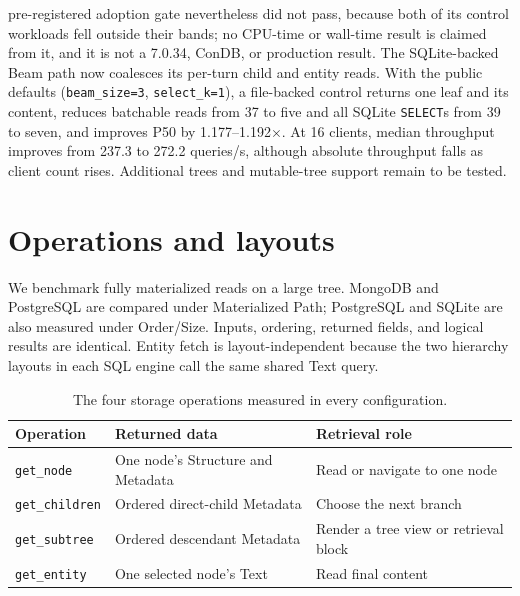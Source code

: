 \documentclass[10pt]{article}
\newcommand{\code}[1]{\texttt{#1}}
\newcommand{\hdr}{\rowcolor{hdrgray}}
\newenvironment{ctab}{\par\smallskip\centering\small
  \setlength{\tabcolsep}{5pt}\renewcommand{\arraystretch}{1.12}}{\par\smallskip}
\renewenvironment{abstract}{%
  \par\medskip\noindent{\bfseries\abstractname.}\enspace\ignorespaces
}{\par\medskip}
\begin{document}
\begin{abstract}
pre-registered adoption gate nevertheless did not pass, because both of its
control workloads fell outside their bands; no CPU-time or wall-time result is
claimed from it, and it is not a 7.0.34, ConDB, or production result. The SQLite-backed Beam path now
coalesces its per-turn child and
entity reads. With the public defaults (\code{beam\_size=3},
\code{select\_k=1}), a file-backed control returns one leaf and its content,
reduces batchable reads from 37 to five and all SQLite \code{SELECT}s from 39
to seven, and improves P50 by 1.177--1.192$\times$. At 16 clients, median
throughput improves from 237.3 to 272.2 queries/s, although absolute throughput
falls as client count rises. Additional trees and mutable-tree support remain
to be tested.
\end{abstract}

\section{Operations and layouts}\label{sec:scope}

We benchmark fully materialized reads on a large tree. MongoDB and PostgreSQL
are compared under Materialized Path; PostgreSQL and SQLite are also measured
under Order/Size. Inputs, ordering, returned fields, and logical results are
identical. Entity fetch is layout-independent because the two hierarchy
layouts in each SQL engine call the same shared Text query.

\begin{table}[ht]
\caption{The four storage operations measured in every configuration.}
\label{tab:operations}
\begin{ctab}
\begin{tabular}{@{}lll@{}}
\toprule
\hdr Operation & Returned data & Retrieval role \\
\midrule
\code{get\_node}     & One node's Structure and Metadata & Read or navigate to one node \\
\code{get\_children} & Ordered direct-child Metadata & Choose the next branch \\
\code{get\_subtree}  & Ordered descendant Metadata & Render a tree view or retrieval block \\
\code{get\_entity}   & One selected node's Text & Read final content \\
\bottomrule
\end{tabular}
\end{ctab}
\end{table}
\end{document}
